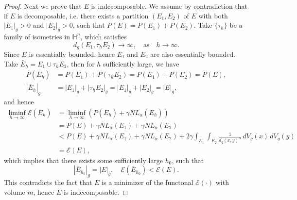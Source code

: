 \documentclass[11pt,reqno]{amsart}
\theoremstyle{definition}
\theoremstyle{remark}
\numberwithin{equation}{section}
\renewcommand{\(}{\left(}
\renewcommand{\)}{\right)}
\renewcommand{\-}{\overline}
\begin{document}
\begin{proof}
	Next we prove that $E$ is indecomposable. We assume by contradiction that if $E$ is decomposable, i.e. there exists a partition $(E_1,E_2)$ of  $E$ with both $|E_1|_g>0$ and $|E_2|_g>0$, such that $P(E)=P(E_1)+P(E_2)$. Take $\{\tau_h\}$ be a family of isometries in $\mathbb{H}^n$, which satisfies 
  \begin{equation}
  	d_g(E_1,\tau_h E_2)\to\infty, \quad \text{as} \quad h\to\infty.
  	\end{equation}
  	Since $E$ is essentially bounded, hence $E_1$ and $E_2$ are also essentially bounded. Take $\bar{E}_h=E_1\cup \tau_h E_2$, then for $h$ sufficiently large, we have
  	\begin{align*}
  		P(\bar{E}_h)&=P(E_1)+P(\tau_h E_2)=P(E_1)+P(E_2)=P(E),\\
  		|\bar{E}_h|_g&=|E_1|_g+|\tau_h E_2|_g=|E_1|_g+|E_2|_g=|E|_g,
  	\end{align*}
  	and hence
  	\begin{align*}
  		\liminf_{h\to\infty}{\mathcal{E}}(\bar{E}_h)&=\liminf_{h\to\infty}(P(\bar{E}_h)+\gamma NL_{\alpha}(\bar{E}_h))\\
  		&=P(E)+\gamma NL_{\alpha}(E_1)+\gamma NL_{\alpha}(E_2)\\
  		&<P(E)+\gamma NL_{\alpha}(E_1)+\gamma NL_{\alpha}(E_2)+2\gamma\int_{E_1}\int_{E_2}{\frac{1}{d_{g}(x,y)^{\alpha}}\,dV_g(x)\,dV_g(y)}\\
  		&=\mathcal{E}(E),
  	\end{align*}
  	which implies that there exists some sufficiently large $h_0$, such that
  \begin{equation}
  	|\bar{E}_{h_0}|_g=|E|_g,\quad {\mathcal{E}}(\bar{E}_{h_0})<\mathcal{E}(E).
  \end{equation}
  This contradicts the fact that $E$ is a minimizer of the functonal $\mathcal{E}(\cdot)$ with volume $m$, hence $E$ is indecomposable.
\end{proof}
\end{document}
